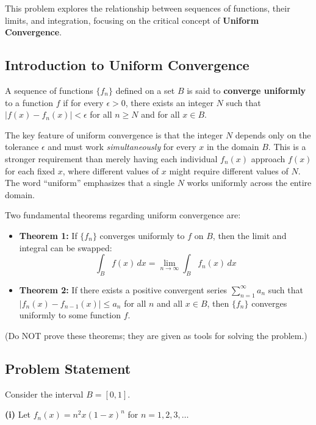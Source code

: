 \begin{problem}

This problem explores the relationship between sequences of functions, their limits, and integration, focusing on the critical concept of \textbf{Uniform Convergence}.

\subsection*{Introduction to Uniform Convergence}
A sequence of functions $\{f_n\}$ defined on a set $B$ is said to \textbf{converge uniformly} to a function $f$ if for every $\epsilon > 0$, there exists an integer $N$ such that $|f(x) - f_n(x)| < \epsilon$ for all $n \geq N$ and for all $x \in B$. 

The key feature of uniform convergence is that the integer $N$ depends only on the tolerance $\epsilon$ and must work \textit{simultaneously} for every $x$ in the domain $B$. This is a stronger requirement than merely having each individual $f_n(x)$ approach $f(x)$ for each fixed $x$, where different values of $x$ might require different values of $N$. The word ``uniform'' emphasizes that a single $N$ works uniformly across the entire domain.

Two fundamental theorems regarding uniform convergence are:
\begin{itemize}
    \item \textbf{Theorem 1:} If $\{f_n\}$ converges uniformly to $f$ on $B$, then the limit and integral can be swapped: 
    $$\int_B f(x) \, dx = \lim_{n \to \infty} \int_B f_n(x) \, dx$$
    \item \textbf{Theorem 2:} If there exists a positive convergent series $\sum_{n=1}^\infty a_n$ such that $|f_n(x) - f_{n-1}(x)| \leq a_n$ for all $n$ and all $x \in B$, then $\{f_n\}$ converges uniformly to some function $f$.
\end{itemize}

(Do NOT prove these theorems; they are given as tools for solving the problem.)

\subsection*{Problem Statement}

Consider the interval $B = [0, 1]$.

\textbf{(i)} Let $f_n(x) = n^2 x (1-x)^n$ for $n = 1, 2, 3, \dots$


\end{problem}
